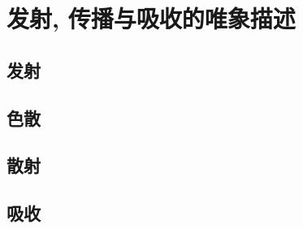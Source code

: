 

\section{发射, 传播与吸收的唯象描述}\label{27-3}

\subsection{发射}\label{27-3-1}

\subsection{色散}\label{27-3-2}

\subsection{散射}\label{27-3-3}

\subsection{吸收}\label{27-3-4}
